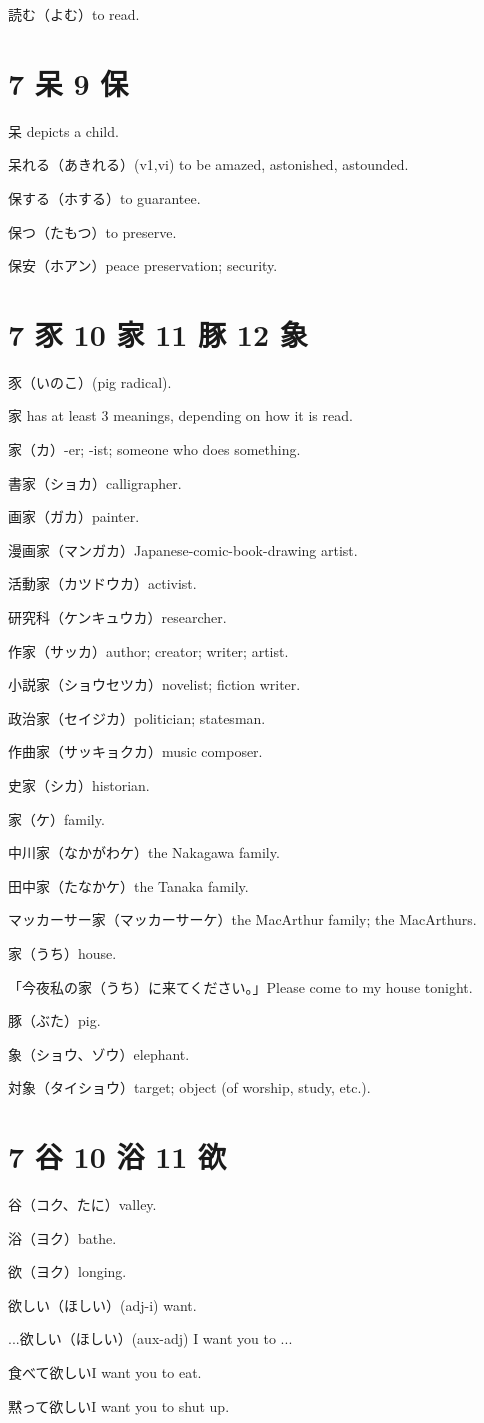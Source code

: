読む（よむ）to read.

\section{7 呆 9 保}

呆 depicts a child.

呆れる（あきれる）(v1,vi) to be amazed, astonished, astounded.

保する（ホする）to guarantee.

保つ（たもつ）to preserve.

保安（ホアン）peace preservation; security.

\section{7 豕 10 家 11 豚 12 象}

豕（いのこ）(pig radical).

家 has at least 3 meanings, depending on how it is read.

家（カ）-er; -ist; someone who does something.

書家（ショカ）calligrapher.

画家（ガカ）painter.

漫画家（マンガカ）Japanese-comic-book-drawing artist.

活動家（カツドウカ）activist.

研究科（ケンキュウカ）researcher.

作家（サッカ）author; creator; writer; artist.

小説家（ショウセツカ）novelist; fiction writer.

政治家（セイジカ）politician; statesman.

作曲家（サッキョクカ）music composer.

史家（シカ）historian.

家（ケ）family.

中川家（なかがわケ）the Nakagawa family.

田中家（たなかケ）the Tanaka family.

マッカーサー家（マッカーサーケ）the MacArthur family; the MacArthurs.

家（うち）house.

「今夜私の家（うち）に来てください。」Please come to my house tonight.

豚（ぶた）pig.

象（ショウ、ゾウ）elephant.

対象（タイショウ）target; object (of worship, study, etc.).

\section{7 谷 10 浴 11 欲}

谷（コク、たに）valley.

浴（ヨク）bathe.

欲（ヨク）longing.

欲しい（ほしい）(adj-i) want.

...欲しい（ほしい）(aux-adj) I want you to ...

食べて欲しいI want you to eat.

黙って欲しいI want you to shut up.
